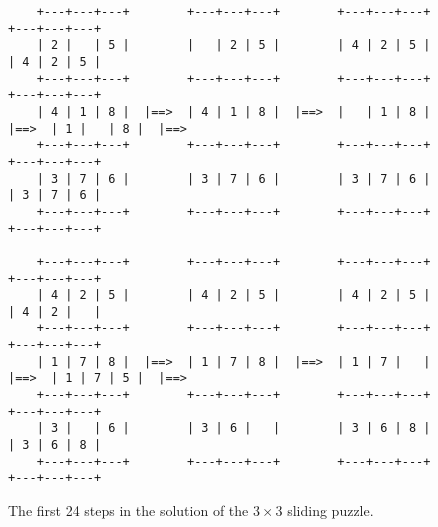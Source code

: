 \begin{figure}[!ht]
\begin{Verbatim}
    +---+---+---+        +---+---+---+        +---+---+---+        +---+---+---+
    | 2 |   | 5 |        |   | 2 | 5 |        | 4 | 2 | 5 |        | 4 | 2 | 5 |
    +---+---+---+        +---+---+---+        +---+---+---+        +---+---+---+
    | 4 | 1 | 8 |  |==>  | 4 | 1 | 8 |  |==>  |   | 1 | 8 |  |==>  | 1 |   | 8 |  |==>
    +---+---+---+        +---+---+---+        +---+---+---+        +---+---+---+
    | 3 | 7 | 6 |        | 3 | 7 | 6 |        | 3 | 7 | 6 |        | 3 | 7 | 6 |
    +---+---+---+        +---+---+---+        +---+---+---+        +---+---+---+

    +---+---+---+        +---+---+---+        +---+---+---+        +---+---+---+
    | 4 | 2 | 5 |        | 4 | 2 | 5 |        | 4 | 2 | 5 |        | 4 | 2 |   |
    +---+---+---+        +---+---+---+        +---+---+---+        +---+---+---+
    | 1 | 7 | 8 |  |==>  | 1 | 7 | 8 |  |==>  | 1 | 7 |   |  |==>  | 1 | 7 | 5 |  |==>
    +---+---+---+        +---+---+---+        +---+---+---+        +---+---+---+
    | 3 |   | 6 |        | 3 | 6 |   |        | 3 | 6 | 8 |        | 3 | 6 | 8 |
    +---+---+---+        +---+---+---+        +---+---+---+        +---+---+---+
\end{Verbatim}
\vspace*{-0.3cm}
\caption{The first 24 steps in the solution of the $3 \times 3$ sliding puzzle.}
\label{fig:8-puzzle.solution1}
\end{figure}

